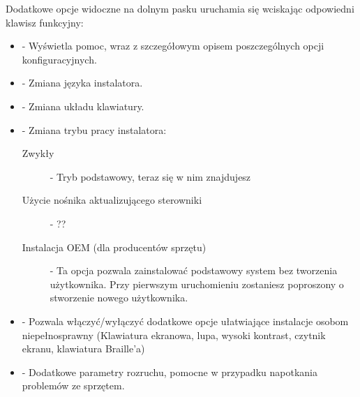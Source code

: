Dodatkowe opcje widoczne na dolnym pasku uruchamia się wciskając odpowiedni klawisz funkcyjny:
\begin{itemize}
\item {} - Wyświetla pomoc, wraz z szczegółowym opisem poszczególnych opcji konfiguracyjnych.
\item {} - Zmiana języka instalatora.
\item {} - Zmiana układu klawiatury.
\item {} - Zmiana trybu pracy instalatora:
        \begin{description}
        \item[\textcolor{ubuntu_orange}{Zwykły}] - Tryb podstawowy, teraz się w nim znajdujesz
        \item[\textcolor{ubuntu_orange}{Użycie nośnika aktualizującego sterowniki}] - ?? %
        \item[\textcolor{ubuntu_orange}{Instalacja OEM (dla producentów sprzętu)}] - Ta opcja pozwala zainstalować podstawowy system bez tworzenia użytkownika. Przy pierwszym uruchomieniu zostaniesz poproszony o stworzenie nowego użytkownika.
        \end{description}
\item {} - Pozwala włączyć/wyłączyć dodatkowe opcje ułatwiające instalacje osobom niepełnosprawny (Klawiatura ekranowa, lupa, wysoki kontrast, czytnik ekranu, klawiatura Braille'a)
\item {} - Dodatkowe parametry rozruchu, pomocne w przypadku napotkania problemów ze sprzętem.
\end{itemize}
\clearpage
